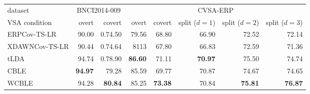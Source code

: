 \sffamily
\small
\begin{tabularx}{\linewidth}{@{}Xrrrrrrr@{}}
\toprule
dataset & \multicolumn{2}{c}{BNCI2014-009} & \multicolumn{5}{c}{CVSA-ERP} \\
\cmidrule(lr){2-3} \cmidrule(lr){4-8}
  VSA condition & overt & covert & overt & covert & \makecell[r]{split \\  ($d=1$)}  & \makecell[r]{split \\ ($d=2$)} & \makecell[r]{split \\ ($d=3$)} \\
\midrule
ERPCov-TS-LR    & 90.00     & 0.74.50        & 79.56     & 68.80      & 66.90  & 72.52      & 72.14 \\
XDAWNCov-TS-LR  & 90.44     & 0.74.64        & 8113     & 67.80      & 66.83  & 72.59      & 71.36 \\
  tLDA            & 94.74     & 0.78.90        & \textbf{86.60} & 71.11      &   \textbf{70.97}      & 75.50      & 74.74 \\
  CBLE            & \textbf{94.97} & 79.28        & 85.59     & 69.77      & 70.87  &  74.67      & 74.65 \\
  WCBLE           & 94.28     & \textbf{80.84}    & 85.25     & \textbf{73.38}
  & 70.84  &  \textbf{75.81}  & \textbf{76.87} \\
\bottomrule
\end{tabularx}
